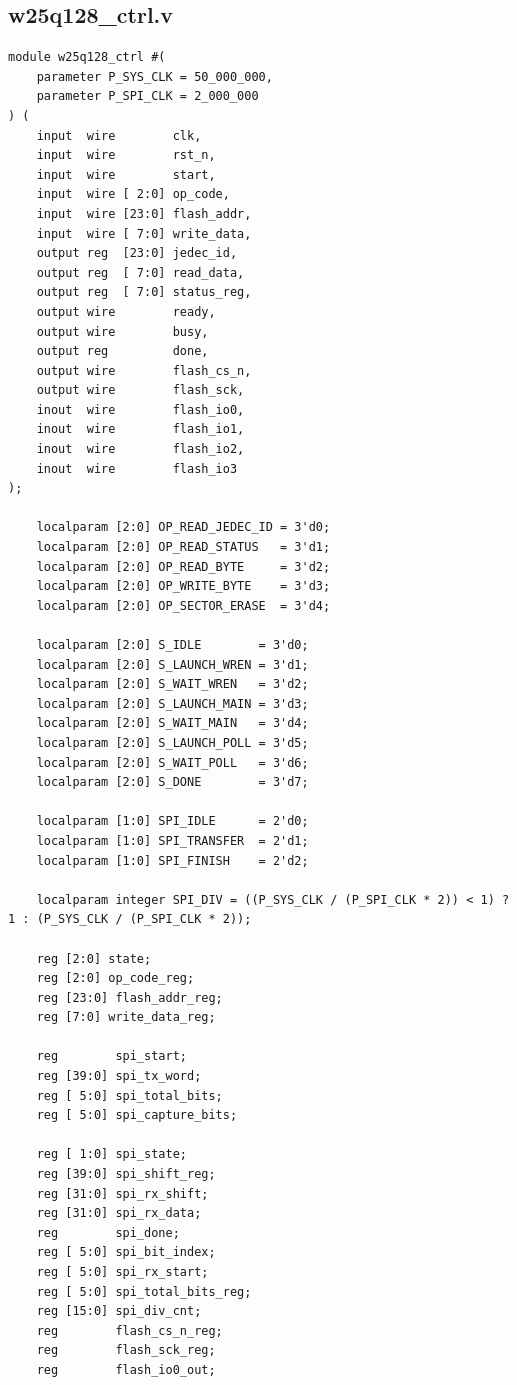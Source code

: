 \documentclass[a4paper,10pt]{article}
\begin{document}
\subsection{w25q128_ctrl.v}
\begin{lstlisting}[caption=w25q128_ctrl.v]
module w25q128_ctrl #(
    parameter P_SYS_CLK = 50_000_000,
    parameter P_SPI_CLK = 2_000_000
) (
    input  wire        clk,
    input  wire        rst_n,
    input  wire        start,
    input  wire [ 2:0] op_code,
    input  wire [23:0] flash_addr,
    input  wire [ 7:0] write_data,
    output reg  [23:0] jedec_id,
    output reg  [ 7:0] read_data,
    output reg  [ 7:0] status_reg,
    output wire        ready,
    output wire        busy,
    output reg         done,
    output wire        flash_cs_n,
    output wire        flash_sck,
    inout  wire        flash_io0,
    inout  wire        flash_io1,
    inout  wire        flash_io2,
    inout  wire        flash_io3
);

    localparam [2:0] OP_READ_JEDEC_ID = 3'd0;
    localparam [2:0] OP_READ_STATUS   = 3'd1;
    localparam [2:0] OP_READ_BYTE     = 3'd2;
    localparam [2:0] OP_WRITE_BYTE    = 3'd3;
    localparam [2:0] OP_SECTOR_ERASE  = 3'd4;

    localparam [2:0] S_IDLE        = 3'd0;
    localparam [2:0] S_LAUNCH_WREN = 3'd1;
    localparam [2:0] S_WAIT_WREN   = 3'd2;
    localparam [2:0] S_LAUNCH_MAIN = 3'd3;
    localparam [2:0] S_WAIT_MAIN   = 3'd4;
    localparam [2:0] S_LAUNCH_POLL = 3'd5;
    localparam [2:0] S_WAIT_POLL   = 3'd6;
    localparam [2:0] S_DONE        = 3'd7;

    localparam [1:0] SPI_IDLE      = 2'd0;
    localparam [1:0] SPI_TRANSFER  = 2'd1;
    localparam [1:0] SPI_FINISH    = 2'd2;

    localparam integer SPI_DIV = ((P_SYS_CLK / (P_SPI_CLK * 2)) < 1) ? 1 : (P_SYS_CLK / (P_SPI_CLK * 2));

    reg [2:0] state;
    reg [2:0] op_code_reg;
    reg [23:0] flash_addr_reg;
    reg [7:0] write_data_reg;

    reg        spi_start;
    reg [39:0] spi_tx_word;
    reg [ 5:0] spi_total_bits;
    reg [ 5:0] spi_capture_bits;

    reg [ 1:0] spi_state;
    reg [39:0] spi_shift_reg;
    reg [31:0] spi_rx_shift;
    reg [31:0] spi_rx_data;
    reg        spi_done;
    reg [ 5:0] spi_bit_index;
    reg [ 5:0] spi_rx_start;
    reg [ 5:0] spi_total_bits_reg;
    reg [15:0] spi_div_cnt;
    reg        flash_cs_n_reg;
    reg        flash_sck_reg;
    reg        flash_io0_out;


\end{lstlisting}
\end{document}
